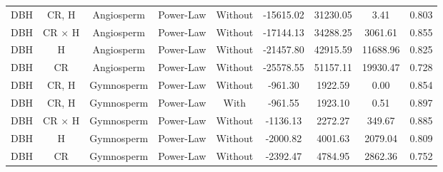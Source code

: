 \documentclass[
  12pt,
  letterpaper,
  DIV=11,
  numbers=noendperiod]{scrartcl}
\begin{document}
\begin{longtable*}[t]{ccccccccc}
DBH & CR, H & Angiosperm & Power-Law & Without & -15615.02 & 31230.05 & 3.41 & 0.803\\
DBH & CR × H & Angiosperm & Power-Law & Without & -17144.13 & 34288.25 & 3061.61 & 0.855\\
DBH & H & Angiosperm & Power-Law & Without & -21457.80 & 42915.59 & 11688.96 & 0.825\\
\addlinespace
DBH & CR & Angiosperm & Power-Law & Without & -25578.55 & 51157.11 & 19930.47 & 0.728\\
DBH & CR, H & Gymnosperm & Power-Law & Without & -961.30 & 1922.59 & 0.00 & 0.854\\
DBH & CR, H & Gymnosperm & Power-Law & With & -961.55 & 1923.10 & 0.51 & 0.897\\
DBH & CR × H & Gymnosperm & Power-Law & Without & -1136.13 & 2272.27 & 349.67 & 0.885\\
DBH & H & Gymnosperm & Power-Law & Without & -2000.82 & 4001.63 & 2079.04 & 0.809\\
\addlinespace
DBH & CR & Gymnosperm & Power-Law & Without & -2392.47 & 4784.95 & 2862.36 & 0.752\\
\bottomrule
\end{longtable*}
\endgroup{}

\newpage
\end{document}
